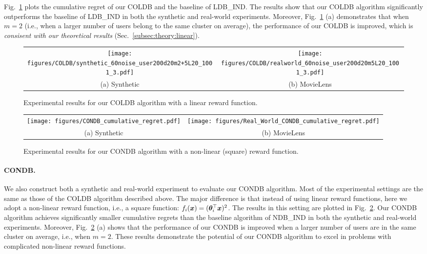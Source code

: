 Fig.~\ref{fig:exp:linear} plots the cumulative regret of our COLDB and the baseline of LDB\_IND.
The results show that our COLDB algorithm significantly outperforms the baseline of LDB\_IND in both the synthetic and real-world experiments. Moreover, Fig.~\ref{fig:exp:linear} (a) demonstrates that when $m=2$ (i.e., when a larger number of users belong to the same cluster on average), the performance of our COLDB is improved, which is \emph{consisent with our theoretical results} (Sec.~\ref{subsec:theory:linear}).
\begin{figure}[t]
     \centering
     \begin{tabular}{cc}
        \hspace{-3mm} \texttt{[image: figures/COLDB/synthetic\_60noise\_user200d20m2+5L20\_1001\_3.pdf]} &\hspace{-5mm} 
         \texttt{[image: figures/COLDB/realworld\_60noise\_user200d20m5L20\_1001\_3.pdf]} \\
         {\hspace{-3mm}(a) Synthetic} & {(b) MovieLens} 
     \end{tabular}
     \caption{
     Experimental results for our COLDB algorithm with a linear reward function.
     }
     \label{fig:exp:linear}
\end{figure}
\begin{figure}[h]
     \centering
     \begin{tabular}{cc}
        \hspace{-3mm} \texttt{[image: figures/CONDB\_cumulative\_regret.pdf]} &\hspace{-5mm} 
         \texttt{[image: figures/Real\_World\_CONDB\_cumulative\_regret.pdf]} \\
         {\hspace{-3mm}(a) Synthetic} & {(b) MovieLens} 
     \end{tabular}
     \caption{
     Experimental results for our CONDB algorithm with a non-linear (square) reward function.
     }
     \label{fig:exp:neural}
\end{figure}

\paragraph{CONDB.}
We also construct both a synthetic and real-world experiment to evaluate our CONDB algorithm.
Most of the experimental settings are the same as those of the COLDB algorithm described above. The major difference is that instead of using linear reward functions, here we adopt a non-linear reward function, i.e., a square function: $f_i(\boldsymbol{x})=(\boldsymbol{\theta}_i^{\top} \boldsymbol{x})^2$. 
The results in this setting are plotted in Fig.~\ref{fig:exp:neural}.
Our CONDB algorithm achieves significantly smaller cumulative regrets than the baseline algorithm of NDB\_IND in both the synthetic and real-world experiments. Moreover, Fig.~\ref{fig:exp:neural} (a) shows that the performance of our CONDB is improved when a larger number of users are in the same cluster on average, i.e., when $m=2$.
These results demonstrate the potential of our CONDB algorithm to excel in problems with complicated non-linear reward functions.
